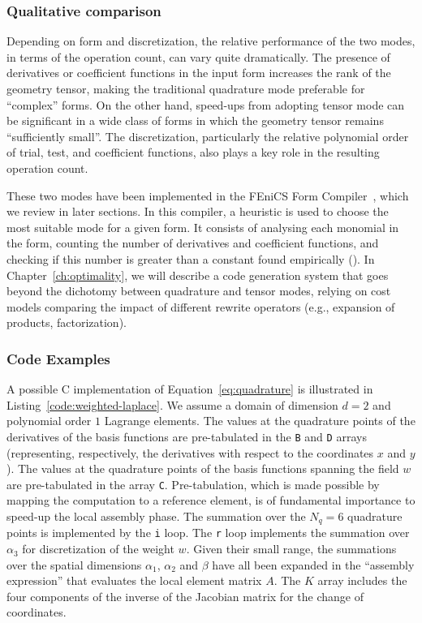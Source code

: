 \subsubsection{Qualitative comparison}
Depending on form and discretization, the relative performance of the two modes, in terms of the operation count, can vary quite dramatically. The presence of derivatives or coefficient functions in the input form increases the rank of the geometry tensor, making the traditional quadrature mode preferable for ``complex'' forms. On the other hand, speed-ups from adopting tensor mode can be significant in a wide class of forms in which the geometry tensor remains ``sufficiently small''. The discretization, particularly the relative polynomial order of trial, test, and coefficient functions, also plays a key role in the resulting operation count. 

These two modes have been implemented in the FEniCS Form Compiler~\cite{FFC-TC}, which we review in later sections. In this compiler, a heuristic is used to choose the most suitable mode for a given form. It consists of analysing each monomial in the form, counting the number of derivatives and coefficient functions, and checking if this number is greater than a constant found empirically (\cite{Fenics}). In Chapter~\ref{ch:optimality}, we will describe a code generation system that goes beyond the dichotomy between quadrature and tensor modes, relying on cost models comparing the impact of different rewrite operators (e.g., expansion of products, factorization).


\subsubsection{Code Examples}
\label{sec:bkg:mathcode}
A possible C implementation of Equation~\ref{eq:quadrature} is illustrated in Listing~\ref{code:weighted-laplace}. We assume a domain of dimension $d=2$ and polynomial order $1$ Lagrange elements. The values at the quadrature points of the derivatives of the basis functions are pre-tabulated in the \texttt{B} and \texttt{D} arrays (representing, respectively, the derivatives with respect to the coordinates $x$ and $y$). The values at the quadrature points of the basis functions spanning the field $w$ are pre-tabulated in the array \texttt{C}. Pre-tabulation, which is made possible by mapping the computation to a reference element, is of fundamental importance to speed-up the local assembly phase. The summation over the $N_q = 6$ quadrature points is implemented by the \texttt{i} loop. The \texttt{r} loop implements the summation over $\alpha_3$ for discretization of the weight $w$. Given their small range, the summations over the spatial dimensions $\alpha_1$, $\alpha_2$ and $\beta$ have all been expanded in the ``assembly expression'' that evaluates the local element matrix $A$. The $K$ array includes the four components of the inverse of the Jacobian matrix for the change of coordinates. 

